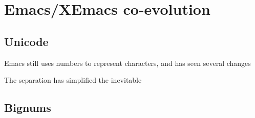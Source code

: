 \documentclass[format=acmsmall, review=false, screen=true]{acmart}
\begin{document}



\section{Emacs/XEmacs co-evolution}

\subsection{Unicode}

Emacs still uses numbers to represent characters, and has seen several changes

The separation has simplified the inevitable 

\subsection{Bignums}











\end{document}

